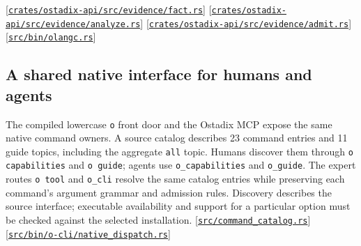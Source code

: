 \documentclass[11pt,oneside]{article}
\newcommand{\src}[1]{\textcolor{OSlate}{\scriptsize[\href{https://github.com/lostadi/OSTADIX/blob/c0b02c326b2329a95ba52447c7180bc93957cd57/#1}{\nolinkurl{#1}}]}\allowbreak}
\begin{document}
\src{crates/ostadix-api/src/evidence/fact.rs}
\src{crates/ostadix-api/src/evidence/analyze.rs}
\src{crates/ostadix-api/src/evidence/admit.rs}
\src{src/bin/olangc.rs}

\subsection{A shared native interface for humans and agents}
\label{sec:mcp}

The compiled lowercase \texttt{o} front door and the Ostadix MCP expose the
same native command owners. A source catalog describes 23 command entries and
11 guide topics, including the aggregate \texttt{all} topic. Humans discover
them through \texttt{o capabilities} and \texttt{o guide}; agents use
\texttt{o\_capabilities} and \texttt{o\_guide}. The expert routes
\texttt{o tool} and \texttt{o\_cli} resolve the same catalog entries while
preserving each command's argument grammar and admission rules. Discovery
describes the source interface; executable availability and support for a
particular option must be checked against the selected installation.
\src{src/command_catalog.rs}
\src{src/bin/o-cli/native_dispatch.rs}
\end{document}
